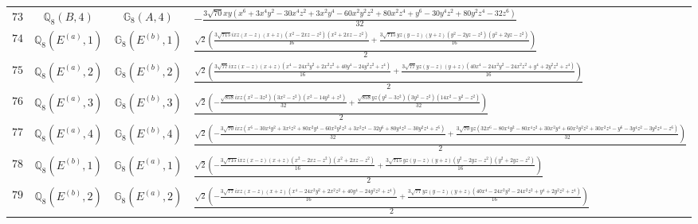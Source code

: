 \documentclass[fleqn,8pt,landscape]{jsarticle}
\begin{document}
\begin{table}[ht!]
\begin{center}
\begin{tabular}{cccl}
$ 73 $ & $ \mathbb{Q}_{8}(B,4) $ & $ \mathbb{G}_{8}(A,4) $ & $ - \frac{3 \sqrt{70} x y \left(x^{6} + 3 x^{4} y^{2} - 30 x^{4} z^{2} + 3 x^{2} y^{4} - 60 x^{2} y^{2} z^{2} + 80 x^{2} z^{4} + y^{6} - 30 y^{4} z^{2} + 80 y^{2} z^{4} - 32 z^{6}\right)}{32} $ \\
$ 74 $ & $ \mathbb{Q}_{8}(E^{(a)},1) $ & $ \mathbb{G}_{8}(E^{(b)},1) $ & $ \frac{\sqrt{2} \left(\frac{3 \sqrt{715} i x z \left(x - z\right) \left(x + z\right) \left(x^{2} - 2 x z - z^{2}\right) \left(x^{2} + 2 x z - z^{2}\right)}{16} + \frac{3 \sqrt{715} y z \left(y - z\right) \left(y + z\right) \left(y^{2} - 2 y z - z^{2}\right) \left(y^{2} + 2 y z - z^{2}\right)}{16}\right)}{2} $ \\
$ 75 $ & $ \mathbb{Q}_{8}(E^{(a)},2) $ & $ \mathbb{G}_{8}(E^{(b)},2) $ & $ \frac{\sqrt{2} \left(\frac{3 \sqrt{77} i x z \left(x - z\right) \left(x + z\right) \left(x^{4} - 24 x^{2} y^{2} + 2 x^{2} z^{2} + 40 y^{4} - 24 y^{2} z^{2} + z^{4}\right)}{16} + \frac{3 \sqrt{77} y z \left(y - z\right) \left(y + z\right) \left(40 x^{4} - 24 x^{2} y^{2} - 24 x^{2} z^{2} + y^{4} + 2 y^{2} z^{2} + z^{4}\right)}{16}\right)}{2} $ \\
$ 76 $ & $ \mathbb{Q}_{8}(E^{(a)},3) $ & $ \mathbb{G}_{8}(E^{(b)},3) $ & $ \frac{\sqrt{2} \left(- \frac{\sqrt{858} i x z \left(x^{2} - 3 z^{2}\right) \left(3 x^{2} - z^{2}\right) \left(x^{2} - 14 y^{2} + z^{2}\right)}{32} + \frac{\sqrt{858} y z \left(y^{2} - 3 z^{2}\right) \left(3 y^{2} - z^{2}\right) \left(14 x^{2} - y^{2} - z^{2}\right)}{32}\right)}{2} $ \\
$ 77 $ & $ \mathbb{Q}_{8}(E^{(a)},4) $ & $ \mathbb{G}_{8}(E^{(b)},4) $ & $ \frac{\sqrt{2} \left(- \frac{3 \sqrt{70} i x z \left(x^{6} - 30 x^{4} y^{2} + 3 x^{4} z^{2} + 80 x^{2} y^{4} - 60 x^{2} y^{2} z^{2} + 3 x^{2} z^{4} - 32 y^{6} + 80 y^{4} z^{2} - 30 y^{2} z^{4} + z^{6}\right)}{32} + \frac{3 \sqrt{70} y z \left(32 x^{6} - 80 x^{4} y^{2} - 80 x^{4} z^{2} + 30 x^{2} y^{4} + 60 x^{2} y^{2} z^{2} + 30 x^{2} z^{4} - y^{6} - 3 y^{4} z^{2} - 3 y^{2} z^{4} - z^{6}\right)}{32}\right)}{2} $ \\
$ 78 $ & $ \mathbb{Q}_{8}(E^{(b)},1) $ & $ \mathbb{G}_{8}(E^{(a)},1) $ & $ \frac{\sqrt{2} \left(- \frac{3 \sqrt{715} i x z \left(x - z\right) \left(x + z\right) \left(x^{2} - 2 x z - z^{2}\right) \left(x^{2} + 2 x z - z^{2}\right)}{16} + \frac{3 \sqrt{715} y z \left(y - z\right) \left(y + z\right) \left(y^{2} - 2 y z - z^{2}\right) \left(y^{2} + 2 y z - z^{2}\right)}{16}\right)}{2} $ \\
$ 79 $ & $ \mathbb{Q}_{8}(E^{(b)},2) $ & $ \mathbb{G}_{8}(E^{(a)},2) $ & $ \frac{\sqrt{2} \left(- \frac{3 \sqrt{77} i x z \left(x - z\right) \left(x + z\right) \left(x^{4} - 24 x^{2} y^{2} + 2 x^{2} z^{2} + 40 y^{4} - 24 y^{2} z^{2} + z^{4}\right)}{16} + \frac{3 \sqrt{77} y z \left(y - z\right) \left(y + z\right) \left(40 x^{4} - 24 x^{2} y^{2} - 24 x^{2} z^{2} + y^{4} + 2 y^{2} z^{2} + z^{4}\right)}{16}\right)}{2} $ \\

\end{tabular}
\end{center}
\end{table}
\end{document}
